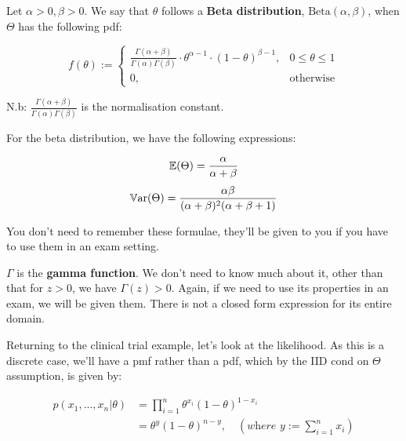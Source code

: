 \documentclass[a4paper]{article}
\begin{document}
                \begin{definition}
                    Let $\alpha > 0, \beta > 0$. We say that $\theta$ follows a
                    \textbf{Beta distribution}, $\text{Beta}(\alpha, \beta)$,
                    when $\Theta$ has the following pdf:

                    $$
                        f(\theta) := \begin{cases}\frac{\Gamma(\alpha + \beta)}
                        {\Gamma(\alpha)\Gamma(\beta)} \cdot \theta^{\alpha - 1}
                        \cdot (1 - \theta)^{\beta - 1}, & 0 \leq \theta \leq 1
                        \\ 0, & \text{otherwise}\end{cases}
                    $$

                    N.b: $\frac{\Gamma(\alpha + \beta)}{\Gamma(\alpha)\Gamma
                    (\beta)}$ is the normalisation constant.

                    For the beta distribution, we have the following
                    expressions:

                    \[
                        \mathbb{E}(\Theta) = \frac{\alpha}{\alpha + \beta}
                    \]
                    \[
                        \mathbb{V}\text{ar}(\Theta) = \frac{\alpha\beta}{(\alpha + \beta)^2(
                        \alpha + \beta + 1)}
                    \]

                    You don't need to remember these formulae, they'll be given
                    to you if you have to use them in an exam setting.

                    $\Gamma$ is the \textbf{gamma function}. We don't need to
                    know much about it, other than that for $z > 0$, we have
                    $\Gamma(z) > 0$. Again, if we need to use its properties in
                    an exam, we will be given them. There is not a closed form
                    expression for its entire domain.
                \end{definition}

                Returning to the clinical trial example, let's look at the
                likelihood. As this is a discrete case, we'll have a pmf rather
                than a pdf, which by the IID cond on $\Theta$ assumption, is
                given by:

                \begin{align*}
                    p(x_1, ..., x_n | \theta) &= \prod_{i=1}^n \theta^{x_i} (1 -
                        \theta)^{1 - x_i} \\
                    & = \theta^y (1 - \theta)^{n - y}, \quad \left(
                        \textit{where } y := \sum_{i=1}^n x_i\right)
                \end{align*}
\end{document}
